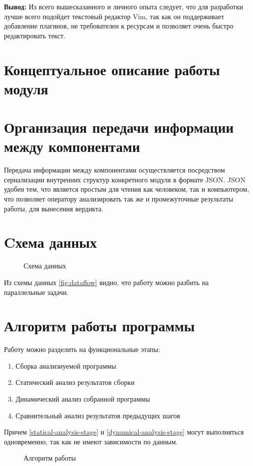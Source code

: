 \textbf{Вывод:} Из всего вышесказанного и личного опыта следует, 
что для разработки {\ProgModule} лучше всего подойдет текстовый редактор Vim,
так как он поддерживает добавление плагинов, не требователен к ресурсам и позволяет
очень быстро редактировать текст.

\section{Концептуальное описание работы модуля}\label{sec:ch2/sec3}

\section{Организация передачи информации между компонентами {\ProgModule}}\label{sec:ch2/sec4}
Передача информации между компонентами {\ProgModule} осуществляется посредством
сериализации внутренних структур конкретного модуля в формате JSON.
JSON удобен тем, что является простым для чтения как человеком, так и компьютером,
что позволяет оператору анализировать так же и промежуточные результаты работы, для
вынесения вердикта.

\section{Cхема данных}\label{sec:ch2/sec5}

\begin{figure}[!htbp]
    \caption{Схема данных {\ProgModule}\label{fig:dataflow}}
    \centerfloat{
        
    }
\end{figure}
Из схемы данных \autoref{fig:dataflow} видно, что работу {\ProgModule} можно разбить на параллельные 
задачи.


\section{Алгоритм работы программы}\label{sec:ch2/sec6}
Работу {\ProgModule} можно разделить на функциональные этапы:
\begin{enumerate}
    \item Сборка анализиуемой программы 
    \item Статический анализ результатов сборки\label{statical-analysis-stage}
    \item Динамический анализ собранной программы\label{dynamical-analysis-stage}
    \item Сравнительный анализ результатов предыдущих шагов
\end{enumerate}

Причем \autoref{statical-analysis-stage} и \autoref{dynamical-analysis-stage} могут выполняться
одновременно, так как не имеют зависимости по данным.

\begin{figure}[!htbp]
    \caption{Алгоритм работы {\ProgModule}\label{fig:algorithm}}
    \centerfloat{
        
    }
\end{figure}

